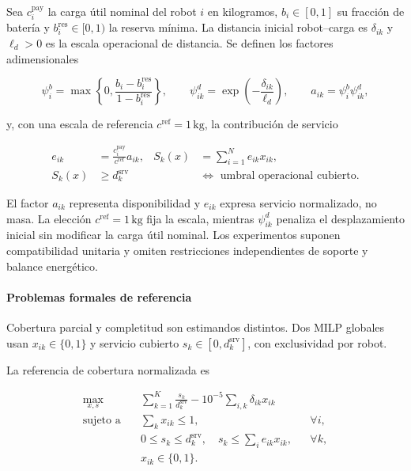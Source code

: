 Sea $c_i^{\mathrm{pay}}$ la carga útil nominal del robot $i$ en kilogramos, $b_i\in[0, 1]$ su fracción de batería y $b_i^{\mathrm{res}}\in[0, 1)$ la reserva mínima. La distancia inicial robot--carga es $\delta_{ik}$ y $\ell_d>0$ es la escala operacional de distancia. Se definen los factores adimensionales

\begin{equation}
\label{eq:sp2-discounts}
  \psi_i^b=\max\!\left\{0,\frac{b_i-b_i^{\mathrm{res}}}{1-b_i^{\mathrm{res}}}\right\},
  \qquad
  \psi_{ik}^d=\exp\!\left(-\frac{\delta_{ik}}{\ell_d}\right),
  \qquad
  a_{ik}=\psi_i^b\psi_{ik}^d,
\end{equation}

y, con una escala de referencia $c^{\mathrm{ref}}=1\,\mathrm{kg}$, la contribución de servicio

\begin{equation}
\label{eq:sp2-effective-capacity}
  \begin{aligned}
    e_{ik}&=\frac{c_i^{\mathrm{pay}}}{c^{\mathrm{ref}}}a_{ik},
    & S_k(x)&=\sum_{i=1}^{N}e_{ik}x_{ik},\\
    S_k(x)&\geq d_k^{\mathrm{srv}}
    &&\Longleftrightarrow \text{ umbral operacional cubierto}.
  \end{aligned}
\end{equation}

El factor $a_{ik}$ representa disponibilidad y $e_{ik}$ expresa servicio normalizado, no masa. La elección $c^{\mathrm{ref}}=1\,\mathrm{kg}$ fija la escala, mientras $\psi_{ik}^d$ penaliza el desplazamiento inicial sin modificar la carga útil nominal. Los experimentos suponen compatibilidad unitaria y omiten restricciones independientes de soporte y balance energético.

\paragraph{Problemas formales de referencia}

Cobertura parcial y completitud son estimandos distintos. Dos MILP globales usan $x_{ik}\in\{0,1\}$ y servicio cubierto $s_k\in[0,d_k^{\mathrm{srv}}]$, con exclusividad por robot.

La referencia de cobertura normalizada es

\begin{equation}
\label{eq:sp2-capacity-oracle}
\begin{aligned}
  \max_{x,s}\quad
  & \sum_{k=1}^{K}\frac{s_k}{d_k^{\mathrm{srv}}}
    -10^{-5}\sum_{i,k}\delta_{ik}x_{ik} \\
  \text{sujeto a}\quad
  & \sum_k x_{ik}\leq1, && \forall i,\\
  & 0\leq s_k\leq d_k^{\mathrm{srv}},\quad s_k\leq\sum_i e_{ik}x_{ik}, && \forall k,\\
  & x_{ik}\in\{0, 1\}. &&
\end{aligned}
\end{equation}

